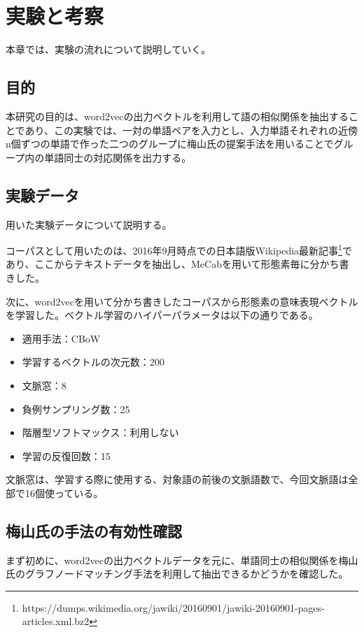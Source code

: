 \chapter{実験と考察}
本章では、実験の流れについて説明していく。

\section{目的}
本研究の目的は、word2vecの出力ベクトルを利用して語の相似関係を抽出することであり、この実験では、一対の単語ペアを入力とし、入力単語それぞれの近傍n個ずつの単語で作った二つのグループに梅山氏の提案手法を用いることでグループ内の単語同士の対応関係を出力する。

\section{実験データ}
用いた実験データについて説明する。

コーパスとして用いたのは、2016年9月時点での日本語版Wikipedia最新記事\footnote{https://dumps.wikimedia.org/jawiki/20160901/jawiki-20160901-pages-articles.xml.bz2}であり、ここからテキストデータを抽出し、MeCabを用いて形態素毎に分かち書きした。

次に、word2vecを用いて分かち書きしたコーパスから形態素の意味表現ベクトルを学習した。ベクトル学習のハイパーパラメータは以下の通りである。
\begin{itemize}
  \item 適用手法：CBoW
  \item 学習するベクトルの次元数：200
  \item 文脈窓：8
  \item 負例サンプリング数：25
  \item 階層型ソフトマックス：利用しない
  \item 学習の反復回数：15
\end{itemize}
文脈窓は、学習する際に使用する、対象語の前後の文脈語数で、今回文脈語は全部で16個使っている。

\section{梅山氏の手法の有効性確認}
まず初めに、word2vecの出力ベクトルデータを元に、単語同士の相似関係を梅山氏のグラフノードマッチング手法を利用して抽出できるかどうかを確認した。

